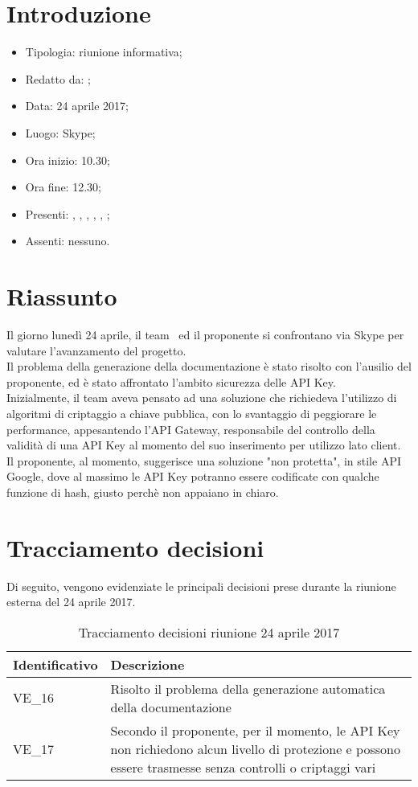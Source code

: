 \section{Introduzione}

	\begin{itemize}
		\item Tipologia: riunione informativa;
		\item Redatto da: \AS;
		\item Data: 24 aprile 2017;
		\item Luogo: Skype;
		\item Ora inizio: 10.30;
		\item Ora fine: 12.30;
		\item Presenti: \DS, \NS, \MC, \DAN, \AS, \AN;	
		\item Assenti: nessuno.
	\end{itemize}

\section{Riassunto}
Il giorno lunedì 24 aprile, il team \gruppo\ ed il proponente si confrontano via Skype per valutare l'avanzamento del progetto.\\
Il problema della generazione della documentazione è stato risolto con l'ausilio del proponente, ed è stato affrontato l'ambito sicurezza delle API Key.\\
Inizialmente, il team aveva pensato ad una soluzione che richiedeva l'utilizzo di algoritmi di criptaggio a chiave pubblica, con lo svantaggio di peggiorare le performance,  appesantendo l'API Gateway, responsabile del controllo della validità di una API Key al momento del suo inserimento per utilizzo lato client.\\
Il proponente, al momento, suggerisce una soluzione "non protetta", in stile API Google, dove al massimo le API Key potranno essere codificate con qualche funzione di hash, giusto perchè non appaiano in chiaro.

\section{Tracciamento decisioni}
Di seguito, vengono evidenziate le principali decisioni prese durante la riunione esterna del 24 aprile 2017.

\begin{table}[H]
	\begin{center}
		\begin{tabular}{|p{3cm}| p{11cm}|}
			\hline
			\textbf{Identificativo}	& \textbf{Descrizione} \\
			\hline
			VE\_16	&  Risolto il problema della generazione automatica della documentazione \\
			\hline
			VE\_17 & Secondo il proponente, per il momento, le API Key non richiedono alcun livello di protezione e possono essere trasmesse senza controlli o criptaggi vari \\
			\hline
		\end{tabular}
		\caption{Tracciamento decisioni riunione 24 aprile 2017}
	\end{center}
\end{table}